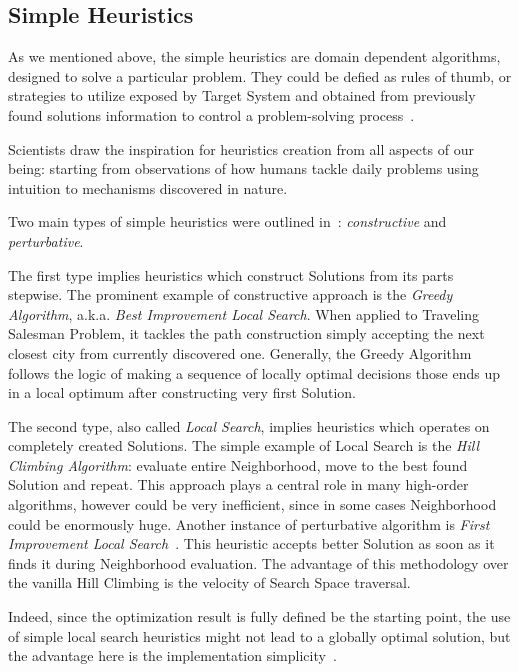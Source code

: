 \subsection{Simple Heuristics}
As we mentioned above, the simple heuristics are domain dependent algorithms, designed to solve a particular problem.
They could be defied as rules of thumb, or strategies to utilize exposed by Target System and obtained from previously found solutions information to control a problem-solving process~\cite{pearl1984intelligent}. 

Scientists draw the inspiration for heuristics creation from all aspects of our being: starting from observations of how humans tackle daily problems using intuition to mechanisms discovered in nature.

Two main types of simple heuristics were outlined in~\cite{burke2019classification}: \textit{constructive} and \textit{perturbative}. 

The first type implies heuristics which construct Solutions from its parts stepwise. 
The prominent example of constructive approach is the \textit{Greedy Algorithm}, a.k.a. \textit{Best Improvement Local Search}. When applied to Traveling Salesman Problem, it tackles the path construction simply accepting the next closest city from currently discovered one. Generally, the Greedy Algorithm follows the logic of making a sequence of locally optimal decisions those ends up in a local optimum after constructing very first Solution. 

The second type, also called \textit{Local Search}, implies heuristics which operates on completely created Solutions. The simple example of Local Search is the \textit{Hill Climbing Algorithm}: evaluate entire Neighborhood, move to the best found Solution and repeat. This approach plays a central role in many high-order algorithms, however could be very inefficient, since in some cases Neighborhood could be enormously huge. 
Another instance of perturbative algorithm is \textit{First Improvement Local Search}~\cite{voudouris1999guided}. This heuristic accepts better Solution as soon as it finds it during Neighborhood evaluation. The advantage of this methodology over the vanilla Hill Climbing is the velocity of Search Space traversal.

Indeed, since the optimization result is fully defined be the starting point, the use of simple local search heuristics might not lead to a globally optimal solution, but the advantage here is the implementation simplicity~\cite{williamson2011design}.

